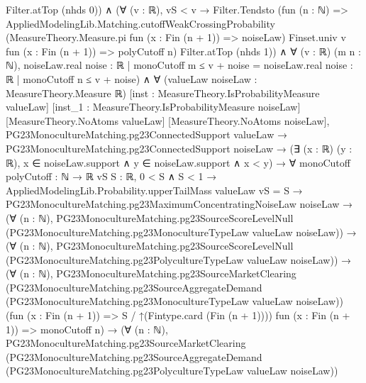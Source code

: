 \documentclass[10pt]{article}
\begin{document}
\begin{ReviewVerbatim}
                              Filter.atTop (nhds 0)) ∧
                          (∀ (v : ℝ),
                              vS < v →
                                Filter.Tendsto
                                  (fun (n : ℕ) =>
                                    AppliedModelingLib.Matching.cutoffWeakCrossingProbability
                                      (MeasureTheory.Measure.pi fun (x : Fin (n + 1)) => noiseLaw) Finset.univ v
                                      fun (x : Fin (n + 1)) => polyCutoff n)
                                  Filter.atTop (nhds 1)) ∧
                            ∀ (v : ℝ) (m n : ℕ),
                              noiseLaw.real {noise : ℝ | monoCutoff m ≤ v + noise} =
                                noiseLaw.real {noise : ℝ | monoCutoff n ≤ v + noise}) ∧
  ∀ (valueLaw noiseLaw : MeasureTheory.Measure ℝ) [inst : MeasureTheory.IsProbabilityMeasure valueLaw]
    [inst_1 : MeasureTheory.IsProbabilityMeasure noiseLaw] [MeasureTheory.NoAtoms valueLaw]
    [MeasureTheory.NoAtoms noiseLaw],
    PG23MonocultureMatching.pg23ConnectedSupport valueLaw →
      PG23MonocultureMatching.pg23ConnectedSupport noiseLaw →
        (∃ (x : ℝ) (y : ℝ), x ∈ noiseLaw.support ∧ y ∈ noiseLaw.support ∧ x < y) →
          ∀ {monoCutoff polyCutoff : ℕ → ℝ} {vS S : ℝ},
            0 < S ∧ S < 1 →
              AppliedModelingLib.Probability.upperTailMass valueLaw vS = S →
                PG23MonocultureMatching.pg23MaximumConcentratingNoiseLaw noiseLaw →
                  (∀ (n : ℕ),
                      PG23MonocultureMatching.pg23SourceScoreLevelNull
                        (PG23MonocultureMatching.pg23MonocultureTypeLaw valueLaw noiseLaw)) →
                    (∀ (n : ℕ),
                        PG23MonocultureMatching.pg23SourceScoreLevelNull
                          (PG23MonocultureMatching.pg23PolycultureTypeLaw valueLaw noiseLaw)) →
                      (∀ (n : ℕ),
                          PG23MonocultureMatching.pg23SourceMarketClearing
                            (PG23MonocultureMatching.pg23SourceAggregateDemand
                              (PG23MonocultureMatching.pg23MonocultureTypeLaw valueLaw noiseLaw))
                            (fun (x : Fin (n + 1)) => S / ↑(Fintype.card (Fin (n + 1)))) fun (x : Fin (n + 1)) =>
                            monoCutoff n) →
                        (∀ (n : ℕ),
                            PG23MonocultureMatching.pg23SourceMarketClearing
                              (PG23MonocultureMatching.pg23SourceAggregateDemand
                                (PG23MonocultureMatching.pg23PolycultureTypeLaw valueLaw noiseLaw))

\end{ReviewVerbatim}
\end{document}
